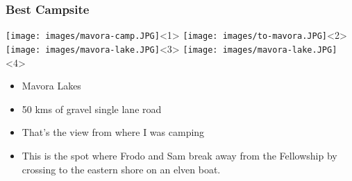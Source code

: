 \documentclass[12pt]{beamer}
\begin{document}
        \begin{frame}
            \frametitle{Best Campsite}
                \begin{center}
                    \texttt{[image: images/mavora-camp.JPG]}<1>
                    \texttt{[image: images/to-mavora.JPG]}<2>
                    \texttt{[image: images/mavora-lake.JPG]}<3>
                    \texttt{[image: images/mavora-lake.JPG]}<4>
                \end{center}
            
                \begin{itemize}
                    \item Mavora Lakes
                    \pause
                    \item 50 kms of gravel single lane road
                    \pause
                    \item That's the view from where I was camping
                    \pause
                    \item This is the spot where Frodo and Sam break away from the Fellowship by crossing to the eastern shore on an elven boat.
                \end{itemize}
        \end{frame}
\end{document}
